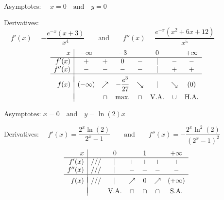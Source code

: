 \begin{Answer}
    
    	\Question Asymptotes: $\quad x=0\quad\mbox{and}\quad y=0$\par
    		Derivatives: $\quad f'(x)=-\dfrac{e^{-x}(x+3)}{x^4}\qquad\mbox{and}\qquad f''(x)=\dfrac{e^{-x}\left(x^2+6x+12\right)}{x^5}$
    		\[ \begin{array}{r|ccccccc}
    		x & -\infty & & -3 &  & 0 &  &+\infty \\
    		\hline
    		f'(x)   & + & + & 0 & - & | & - & - \\
    		f''(x)  & - & - & - & - & | & + & + \\
    		\hline
    		&&&&&&&\vspace{-0.3cm}\\
    		f(x)    & (-\infty) & \nearrow & -\dfrac{e^3}{27} & \searrow & | & \searrow & (0)\\
    		&&&&&&&\vspace{-0.3cm}\\                                                                              
    		&  & \cap & \mbox{max.} & \cap & \mbox{V.A.} & \cup & \mbox{H.A.} \\
    		\end{array}\]
    		
    	\Question Asymptotes: \quad $x=0\quad\mbox{and}\quad y=\ln (2) x$\par
    		Derivatives: $\quad f'(x)=\dfrac{2^x\ln (2)}{2^x-1}\qquad\mbox{and}\qquad f''(x)=-\dfrac{2^x\ln^2(2)}{(2^x-1)^2}$
    		\[ \begin{array}{r|cccccc}
    		x &  & 0 &  & 1 & &+\infty \\
    		\hline
    		f'(x)   & /// & | & + & + & + & + \\
    		f''(x)  & /// & | & - & - & - & - \\
    		\hline
    		&&&&&&\vspace{-0.3cm}\\
    		f(x)    & /// & | & \nearrow & 0 & \nearrow & (+\infty)\\
    		&&&&&&\vspace{-0.3cm}\\                                                                              
    		& & \mbox{V.A.} & \cap & \cap & \cap & \mbox{S.A.} \\
    		\end{array}\]
    		

\end{Answer}
